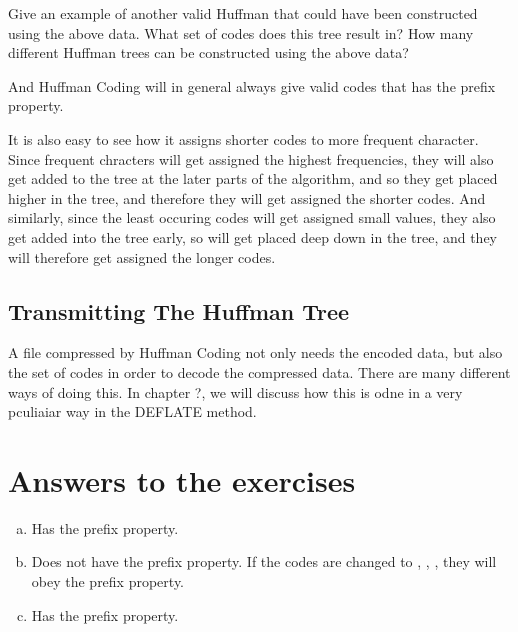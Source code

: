 \begin{Exercise}[label={nuther}]
  Give an example of another valid Huffman that could have been
  constructed using the above data. What set of codes does this tree
  result in? How many different Huffman trees can be constructed using
  the above data?
\end{Exercise}

And Huffman Coding will in general always give valid codes that has
the prefix property. %

It is also easy to see how it assigns shorter codes to more frequent
character. Since frequent chracters will get assigned the highest
frequencies, they will also get added to the tree at the later parts
of the algorithm, and so they get placed higher in the tree, and
therefore they will get assigned the shorter codes. And similarly,
since the least occuring codes will get assigned small values, they
also get added into the tree early, so will get placed deep down in
the tree, and they will therefore get assigned the longer codes.

\subsection{Transmitting The Huffman Tree}

A file compressed by Huffman Coding not only needs the encoded data,
but also the set of codes in order to decode the compressed
data. There are many different ways of doing this. In chapter ?, we
will discuss how this is odne in a very pculiaiar way in the DEFLATE method.


\section{Answers to the exercises}

\begin{Answer}[ref={prefix-prop}]

  \begin{enumerate}[(a)]
  \item Has the prefix property.
  \item Does not have the prefix property. If the codes are changed to
    , , , 
    they will obey the prefix property.
  \item Has the prefix property.

  \end{enumerate}

\end{Answer}

